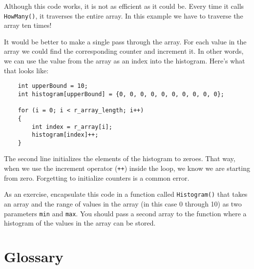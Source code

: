 Although this code works, it is not as efficient as it could
be.  Every time it calls {\tt HowMany()}, it traverses the
entire array.  In this example we have to traverse the
array ten times!

It would be better to make a single pass through the array.
For each value in the array we could find the corresponding
counter and increment it.  In other words, we can use the
value from the array as an index into the histogram.  Here's
what that looks like:

\begin{verbatim}
    int upperBound = 10;
    int histogram[upperBound] = {0, 0, 0, 0, 0, 0, 0, 0, 0, 0};

    for (i = 0; i < r_array_length; i++) 
    {
        int index = r_array[i];
        histogram[index]++;
    }
\end{verbatim}
%
The second line initializes the elements of the histogram to
zeroes.  That way, when we use the increment
operator ({\tt ++}) inside the loop, we know we are starting from zero.
Forgetting to initialize counters is a common error.

As an exercise, encapsulate this code in a function called {\tt Histogram()} 
that takes an array and the range of values in the array
(in this case 0 through 10) as two parameters \texttt{min} and \texttt{max}. 
You should pass a second array to the function where a histogram of the
values in the array can be stored.


\section{Glossary}

